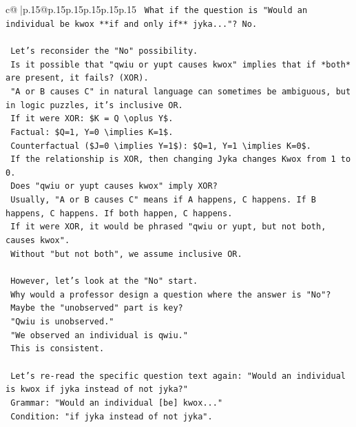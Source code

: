 \documentclass{article}
\begin{document}
{\begin{supertabular}{c@{$\;$}|p{.15\linewidth}@{}p{.15\linewidth}p{.15\linewidth}p{.15\linewidth}p{.15\linewidth}p{.15\linewidth}}
{{{\texttt{    What if the question is "Would an individual be kwox **if and only if** jyka..."? No.} \\
\\ 
\texttt{    Let's reconsider the "No" possibility.} \\
\texttt{    Is it possible that "qwiu or yupt causes kwox" implies that if *both* are present, it fails? (XOR).} \\
\texttt{    "A or B causes C" in natural language can sometimes be ambiguous, but in logic puzzles, it's inclusive OR.} \\
\texttt{    If it were XOR: \$K = Q \textbackslash{}oplus Y\$.} \\
\texttt{    Factual: \$Q=1, Y=0 \textbackslash{}implies K=1\$.} \\
\texttt{    Counterfactual (\$J=0 \textbackslash{}implies Y=1\$): \$Q=1, Y=1 \textbackslash{}implies K=0\$.} \\
\texttt{    If the relationship is XOR, then changing Jyka changes Kwox from 1 to 0.} \\
\texttt{    Does "qwiu or yupt causes kwox" imply XOR?} \\
\texttt{    Usually, "A or B causes C" means if A happens, C happens. If B happens, C happens. If both happen, C happens.} \\
\texttt{    If it were XOR, it would be phrased "qwiu or yupt, but not both, causes kwox".} \\
\texttt{    Without "but not both", we assume inclusive OR.} \\
\\ 
\texttt{    However, let's look at the "No" start.} \\
\texttt{    Why would a professor design a question where the answer is "No"?} \\
\texttt{    Maybe the "unobserved" part is key?} \\
\texttt{    "Qwiu is unobserved."} \\
\texttt{    "We observed an individual is qwiu."} \\
\texttt{    This is consistent.} \\
\\ 
\texttt{    Let's re{-}read the specific question text again: "Would an individual is kwox if jyka instead of not jyka?"} \\
\texttt{    Grammar: "Would an individual {[}be{]} kwox..."} \\
\texttt{    Condition: "if jyka instead of not jyka".} \\
}}}
\end{supertabular}}
\end{document}
